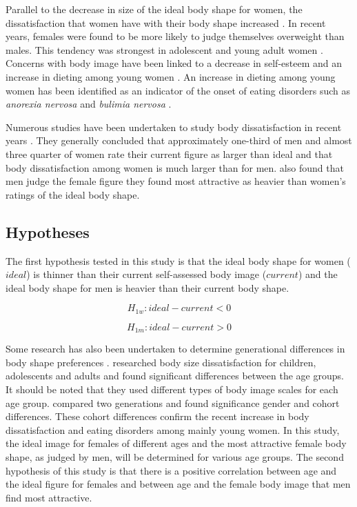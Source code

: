 \documentclass[a4paper, apacite, jou, 11pt]{apa6}
\begin{document}
Parallel to the decrease in size of the ideal body shape for women, the dissatisfaction that women have with their body shape increased \cite{cash_how_2004}. In recent years, females were found to be more likely to judge themselves overweight than males. This tendency was strongest in adolescent and young adult women \cite{fallon_sex_1985,tiggeman_development_1990,tiggeman_body-size_1992}. Concerns with body image have been linked to a decrease in self-esteem and an increase in dieting among young women \cite{hill_eating_1992}. An increase in dieting among young women has been identified as an indicator of the onset of eating disorders such as \emph{anorexia nervosa} and \emph{bulimia nervosa} \cite{barker_body_2003,fear_prevalence_1996,lamb_body_1993}.

Numerous studies have been undertaken to study body dissatisfaction in recent years \cite{fallon_sex_1985,tiggeman_development_1990,tiggeman_body-size_1992,lamb_body_1993,abel_relationship_1996,byrne_should_1996,fear_prevalence_1996,cash_how_2004}. They generally concluded that approximately one-third of men and almost three quarter of women rate their current figure as larger than ideal and that body dissatisfaction among women is much larger than for men.  also found that men judge the female figure they found most attractive as heavier than women's ratings of the ideal body shape.
\subsection{Hypotheses}
\label{sec:orgc76c60f}
The first hypothesis tested in this study is that the ideal body shape for women (\(ideal\)) is thinner than their current self-assessed body image (\(current\)) and the ideal body shape for men is heavier than their current body shape.

$$H_{1w}: ideal - current < 0 $$

$$H_{1m}: ideal - current > 0 $$

Some research has also been undertaken to determine generational differences in body shape preferences \cite{lamb_body_1993}. \cite{tiggeman_development_1990} researched body size dissatisfaction for children, adolescents and adults and found significant differences between the age groups. It should be noted that they used different types of body image scales for each age group.  compared two generations and found significance gender and cohort differences. These cohort differences confirm the recent increase in body dissatisfaction and eating disorders among mainly young women. In this study, the ideal image for females of different ages and the most attractive female body shape, as judged by men, will be determined for various age groups. The second hypothesis of this study is that there is a positive correlation between age and the ideal figure for females and between age and the female body image that men find most attractive.
\end{document}
